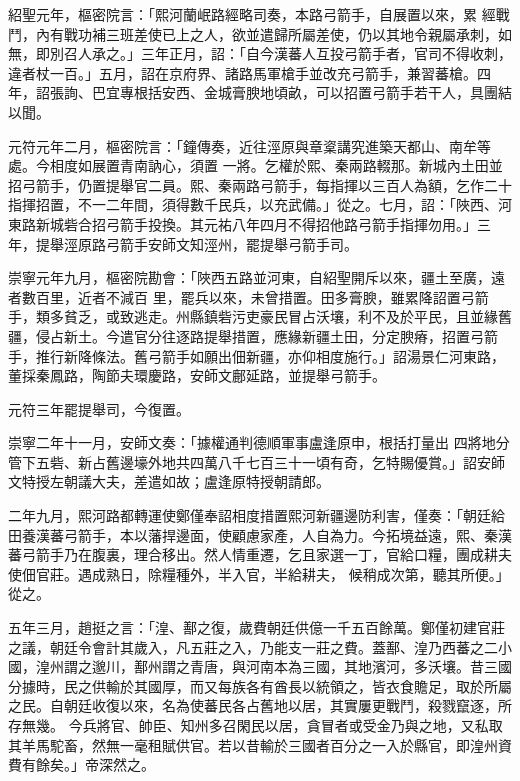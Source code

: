 \begin{pinyinscope}
 紹聖元年，樞密院言：「熙河蘭岷路經略司奏，本路弓箭手，自展置以來，累
 經戰鬥，內有戰功補三班差使已上之人，欲並遣歸所屬差使，仍以其地令親屬承刺，如無，即別召人承之。」三年正月，詔：「自今漢蕃人互投弓箭手者，官司不得收刺，違者杖一百。」五月，詔在京府界、諸路馬軍槍手並改充弓箭手，兼習蕃槍。四年，詔張詢、巴宜專根括安西、金城膏腴地頃畝，可以招置弓箭手若干人，具團結以聞。



 元符元年二月，樞密院言：「鐘傳奏，近往涇原與章楶講究進築天都山、南牟等處。今相度如展置青南訥心，須置
 一將。乞權於熙、秦兩路輟那。新城內土田並招弓箭手，仍置提舉官二員。熙、秦兩路弓箭手，每指揮以三百人為額，乞作二十指揮招置，不一二年間，須得數千民兵，以充武備。」從之。七月，詔：「陜西、河東路新城砦合招弓箭手投換。其元祐八年四月不得招他路弓箭手指揮勿用。」三年，提舉涇原路弓箭手安師文知涇州，罷提舉弓箭手司。



 崇寧元年九月，樞密院勘會：「陜西五路並河東，自紹聖開斥以來，疆土至廣，遠者數百里，近者不減百
 里，罷兵以來，未曾措置。田多膏腴，雖累降詔置弓箭手，類多貧乏，或致逃走。州縣鎮砦污吏豪民冒占沃壤，利不及於平民，且並緣舊疆，侵占新土。今遣官分往逐路提舉措置，應緣新疆土田，分定腴瘠，招置弓箭手，推行新降條法。舊弓箭手如願出佃新疆，亦仰相度施行。」詔湯景仁河東路，董採秦鳳路，陶節夫環慶路，安師文鄜延路，並提舉弓箭手。



 元符三年罷提舉司，今復置。



 崇寧二年十一月，安師文奏：「據權通判德順軍事盧逢原申，根括打量出
 四將地分管下五砦、新占舊邊壕外地共四萬八千七百三十一頃有奇，乞特賜優賞。」詔安師文特授左朝議大夫，差遣如故；盧逢原特授朝請郎。



 二年九月，熙河路都轉運使鄭僅奉詔相度措置熙河新疆邊防利害，僅奏：「朝廷給田養漢蕃弓箭手，本以藩捍邊面，使顧慮家產，人自為力。今拓境益遠，熙、秦漢蕃弓箭手乃在腹裏，理合移出。然人情重遷，乞且家選一丁，官給口糧，團成耕夫使佃官莊。遇成熟日，除糧種外，半入官，半給耕夫，
 候稍成次第，聽其所便。」從之。



 五年三月，趙挺之言：「湟、鄯之復，歲費朝廷供億一千五百餘萬。鄭僅初建官莊之議，朝廷令會計其歲入，凡五莊之入，乃能支一莊之費。蓋鄯、湟乃西蕃之二小國，湟州謂之邈川，鄯州謂之青唐，與河南本為三國，其地濱河，多沃壤。昔三國分據時，民之供輸於其國厚，而又每族各有酋長以統領之，皆衣食贍足，取於所屬之民。自朝廷收復以來，名為使蕃民各占舊地以居，其實屢更戰鬥，殺戮竄逐，所存無幾。
 今兵將官、帥臣、知州多召閑民以居，貪冒者或受金乃與之地，又私取其羊馬駝畜，然無一毫租賦供官。若以昔輸於三國者百分之一入於縣官，即湟州資費有餘矣。」帝深然之。




\end{pinyinscope}
